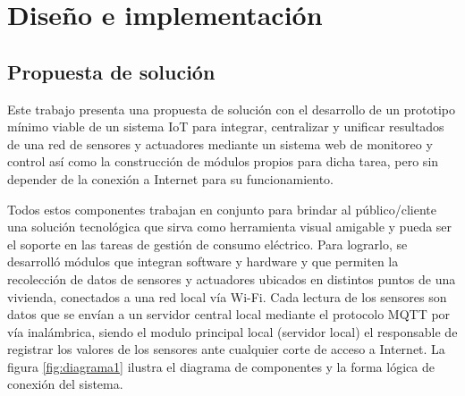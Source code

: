 \chapter{Diseño e implementación} %

\label{Chapter3} %






\section{Propuesta de solución}

Este trabajo presenta una propuesta de solución con el desarrollo de un prototipo mínimo viable de un sistema IoT para integrar, centralizar y unificar resultados de una red de sensores y actuadores mediante un sistema web de monitoreo y control así como la construcción de módulos propios para dicha tarea, pero sin depender de la conexión a Internet para su funcionamiento. 

Todos estos componentes trabajan en conjunto para brindar al público/cliente una solución tecnológica que sirva como herramienta visual amigable y pueda ser el soporte en las tareas de gestión de consumo eléctrico. Para lograrlo, se desarrolló módulos que integran software y hardware y que permiten la recolección de datos de sensores y actuadores ubicados en distintos puntos de una vivienda, conectados a una red local vía Wi-Fi. Cada lectura de los sensores son datos que se envían a un servidor central local mediante el protocolo MQTT por vía inalámbrica, siendo el modulo principal local (servidor local) el responsable de registrar los valores de los sensores ante cualquier corte de acceso a Internet. La figura \ref{fig:diagrama1} ilustra el diagrama de componentes y la forma lógica de conexión del sistema.

